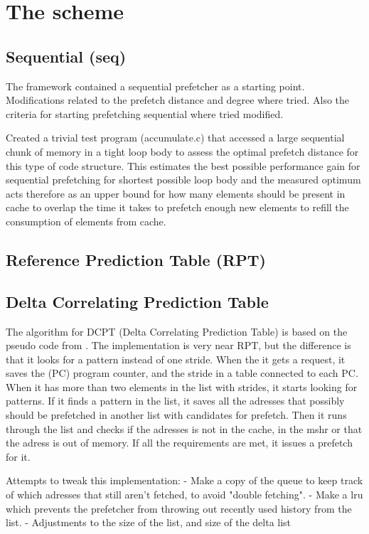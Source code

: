 \chapter{The scheme}

\section{Sequential (seq)}
The framework contained a sequential prefetcher as a starting point.
Modifications related to the prefetch distance and degree where tried.
Also the criteria for starting prefetching sequential where tried modified.


Created a trivial test program (accumulate.c) that accessed a large sequential
chunk of memory in a tight loop body to assess the optimal prefetch distance
for this type of code structure. This estimates the best possible performance
gain for sequential prefetching for shortest possible loop body and the
measured optimum acts therefore as an upper bound for how many elements should
be present in cache to overlap the time it takes to prefetch enough new
elements to refill the consumption of elements from cache.

\section{Reference Prediction Table (RPT)}

\section{Delta Correlating Prediction Table}
The algorithm for DCPT (Delta Correlating Prediction Table) is based on the pseudo code from \cite{dcptpaper}.
The implementation is very near RPT, but the difference is that it looks for a pattern instead of one stride.
When the it gets a request, it saves the (PC) program counter, and the stride in a table connected to each PC. When it has more than two elements in the list with strides, it starts looking for patterns.
If it finds a pattern in the list, it saves all the adresses that possibly should be prefetched in another list with candidates for prefetch.
Then it runs through the list and checks if the adresses is not in the cache, in the mshr or that the adress is out of memory. If all the requirements are met, it issues a prefetch for it.

Attempts to tweak this implementation:
- Make a copy of the queue to keep track of which adresses that still aren't fetched, to avoid "double fetching".
- Make a lru which prevents the prefetcher from throwing out recently used history from the list.
- Adjustments to the size of the list, and size of the delta list


